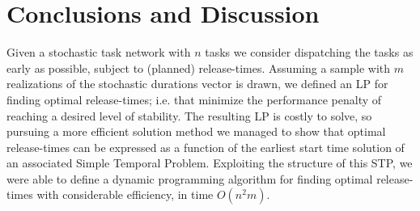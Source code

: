 \section{Conclusions and Discussion}


Given a stochastic task network with $n$ tasks we consider dispatching the tasks as early as possible, subject to (planned) release-times.
Assuming a sample with $m$ realizations of the stochastic durations vector is drawn, we defined an LP for finding 
optimal release-times; i.e. that minimize the performance penalty of reaching a desired level of stability.
The resulting LP is costly to solve, so
pursuing a more efficient solution method we managed to show that optimal release-times can be expressed 
as a function of the earliest start time solution of an associated Simple Temporal Problem. 
Exploiting the structure of this STP, we were able to define a dynamic programming algorithm 
for finding optimal release-times with considerable efficiency, in time $O(n^2 m)$.


